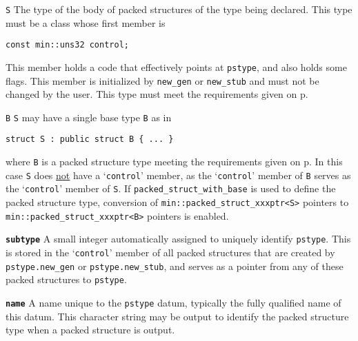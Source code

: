 \documentclass[12pt]{article}
\makeatletter
\newcommand{\TT}[1]{{\tt \bfseries #1}}
\newcommand{\ttmkey}[2]{\TT{#1}\index{#1@{\tt #1}!#2}}
\newcommand{\pagref}[1]{p\pageref{#1}}
\newcommand{\EOL}{\penalty \exhyphenpenalty}
\newcommand{\BRACKETED}[1]{{\tt <#1>}}
\newenvironment{indpar}[1][0.3in]%
	{\begin{list}{}%
		     {\setlength{\itemsep}{0in}%
		      \setlength{\topsep}{0in}%
		      \setlength{\parsep}{1ex}%
		      \setlength{\labelwidth}{#1}%
		      \setlength{\leftmargin}{#1}%
		      \addtolength{\leftmargin}{\labelsep}}%
	 \item}%
	{\end{list}}
\newenvironment{itemlist}[1][1.2in]%
	{\begin{list}{}{\setlength{\labelwidth}{#1}%
		        \setlength{\leftmargin}{\labelwidth}%
		        \addtolength{\leftmargin}{+0.2in}%
		        \renewcommand{\makelabel}[1]{##1\hfill}}}%
	{\end{list}}
\makeatother
\begin{document}
\begin{itemlist}[0.5in]

\item[{\tt S}]
The type of the body of packed structures of the type being
declared.  This type must be a class whose first
member is
\begin{center}
\verb|const min::uns32 control;|
\end{center}
This member holds a code that effectively
points at \verb|pstype|, and also holds some flags.
This member is initialized by \verb|new_gen| or \verb|new_stub| and must not
be changed by the user.
This type must meet the requirements given on
\pagref{PACKED-STRUCTURE-TYPE-REQUIREMENTS}.

\item[{\tt B}]
{\tt S} may have a single base type {\tt B} as in
\begin{indpar}\begin{verbatim}
struct S : public struct B { ... }
\end{verbatim}\end{indpar}
where {\tt B} is a packed structure type meeting the requirements given
on \pagref{PACKED-STRUCTURE-TYPE-REQUIREMENTS}.
In this case {\tt S} does
\underline{not} have a `{\tt control}' member, as
the `{\tt control}' member of {\tt B} serves as
the `{\tt control}' member of {\tt S}.
If {\tt packed\_\EOL struct\_\EOL with\_\EOL base\BRACKETED{S,B}}
is used to define the packed structure type, conversion of
{\tt min::\EOL packed\_\EOL struct\_\EOL xxxptr<S>} pointers
to {\tt min::\EOL packed\_\EOL struct\_\EOL xxxptr<B>}
pointers is enabled.

\end{itemlist}

\begin{itemlist}[0.8in]

\item[\ttmkey{subtype}{in {\tt min::packed\_struct}}]
A small integer automatically assigned to uniquely identify \verb|pstype|.
This is stored in the `{\tt control}' member of all packed
structures that are created by {\tt pstype.new\_\EOL gen} or
{\tt pstype.new\_\EOL stub}, and serves as a pointer from any
of these packed structures to \verb|pstype|.

\item[\ttmkey{name}{in {\tt min::packed\_struct}}]
\label{NAME_IN_PACKED_STRUCT}
A name unique to the \verb|pstype| datum, typically the
fully qualified name of this datum.  This character string may
be output to identify the packed structure type when a packed structure is
output.

\end{itemlist}
\end{document}
